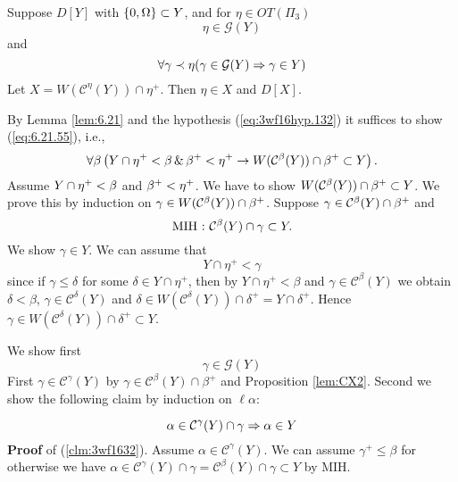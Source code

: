 \documentclass{article}
\begin{document}
\begin{lemma}\label{th:3wf16}
Suppose $D[Y]$ 
with $\{0,\Omega\}\subset Y$, and for $\eta\in OT(\Pi_{3})$
\begin{equation}\label{eq:3wf16hyp.132}
\eta\in\mathcal{G}(Y)
\end{equation}
and
\begin{equation}\label{eq:3wf16hyp.232}
\forall\gamma\prec\eta (\gamma\in\mathcal{G}(Y)
\Rightarrow \gamma\in Y)
\end{equation}
Let $X=W(\mathcal{C}^{\eta}(Y))\cap\eta^{+}$.
Then
$\eta\in X$ and $D[X]$.
\end{lemma}
\bprf
By Lemma \ref{lem:6.21} 
and the hypothesis (\ref{eq:3wf16hyp.132}) it suffices to show 
(\ref{eq:6.21.55}), i.e., 
\[
\forall\beta\left(
Y\cap\eta^{+}<\beta \,\&\, \beta^{+}<\eta^{+} \to
W(\mathcal{C}^{\beta}(Y))\cap\beta^{+}\subset Y
\right)
.\]
Assume $Y\cap\eta^{+}<\beta$ and $\beta^{+}<\eta^{+}$. 
We have to show  
$W(\mathcal{C}^{\beta}(Y))\cap\beta^{+}\subset Y$. 
We prove this by induction on $\gamma\in W(\mathcal{C}^{\beta}(Y))\cap\beta^{+}$. 
Suppose $\gamma\in \mathcal{C}^{\beta}(Y)\cap\beta^{+}$ and 
\[
\mbox{{\rm MIH : }} \mathcal{C}^{\beta}(Y)\cap\gamma\subset Y.
\]
We show $\gamma\in Y$. 
We can assume that
\begin{equation}
\label{eq:3wf9hyp.232X}
Y\cap\eta^{+}<\gamma
\end{equation}
since if $\gamma\leq \delta$ for some $\delta\in Y\cap\eta^{+}$, then by 
$Y\cap\eta^{+}<\beta$ and $\gamma\in \mathcal{C}^{\beta}(Y)$ 
we obtain $\delta<\beta$, 
$\gamma\in \mathcal{C}^{\delta}(Y)$ and 
$\delta\in W(\mathcal{C}^{\delta}(Y))\cap\delta^{+}=Y\cap\delta^{+}$.
Hence $\gamma\in W(\mathcal{C}^{\delta}(Y))\cap\delta^{+}\subset Y$.


We show first 
\begin{equation}
\label{eq:3wf9hyp.232}
\gamma\in\mathcal{G}(Y)
\end{equation}
First $\gamma\in \mathcal{C}^{\gamma}(Y)$ by 
$\gamma\in \mathcal{C}^{\beta}(Y)\cap\beta^{+}$ and Proposition \ref{lem:CX2}. 
Second we show the following claim by induction on $\ell\alpha$:

\begin{equation}\label{clm:3wf1632}
\alpha\in\mathcal{C}^{\gamma}(Y)\cap\gamma \Rightarrow  \alpha\in Y
\end{equation}
\textbf{Proof} of (\ref{clm:3wf1632}). 
Assume $\alpha\in\mathcal{C}^{\gamma}(Y)$.
We can assume $\gamma^{+}\leq\beta$ for otherwise we have 
$\alpha\in \mathcal{C}^{\gamma}(Y)\cap\gamma=\mathcal{C}^{\beta}(Y)\cap\gamma\subset Y$ by MIH.
\end{document}
